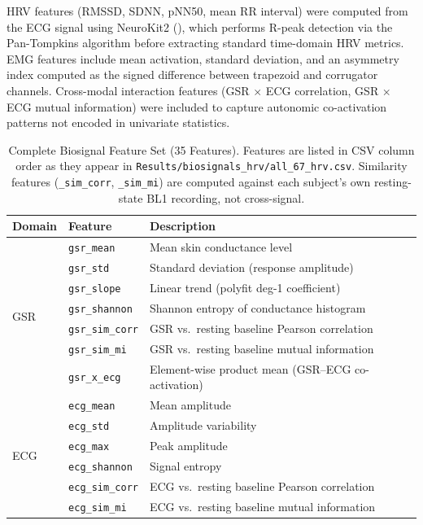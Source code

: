 \documentclass[10pt, twocolumn]{article}
\begin{document}
HRV features (RMSSD, SDNN, pNN50, mean RR interval) were computed from the ECG signal
using NeuroKit2 (\cite{Makowski2021}), which performs R-peak detection via the
Pan-Tompkins algorithm before extracting standard time-domain HRV metrics. EMG features
include mean activation, standard deviation, and an asymmetry index computed as the signed
difference between trapezoid and corrugator channels. Cross-modal interaction features
(GSR $\times$ ECG correlation, GSR $\times$ ECG mutual information) were included to capture
autonomic co-activation patterns not encoded in univariate statistics.

\begin{table}[t]
\centering
\caption{Complete Biosignal Feature Set (35 Features). Features are listed in
CSV column order as they appear in \texttt{Results/biosignals\_hrv/all\_67\_hrv.csv}.
Similarity features (\texttt{\_sim\_corr}, \texttt{\_sim\_mi}) are computed against
each subject's own resting-state BL1 recording, not cross-signal.}
\label{tab:features}
\small
\begin{tabular}{llp{7.8cm}}
\toprule
\textbf{Domain} & \textbf{Feature} & \textbf{Description} \\
\midrule
\multirow{7}{*}{GSR}
  & \texttt{gsr\_mean}       & Mean skin conductance level \\
  & \texttt{gsr\_std}        & Standard deviation (response amplitude) \\
  & \texttt{gsr\_slope}      & Linear trend (polyfit deg-1 coefficient) \\
  & \texttt{gsr\_shannon}    & Shannon entropy of conductance histogram \\
  & \texttt{gsr\_sim\_corr}  & GSR vs.\ resting baseline Pearson correlation \\
  & \texttt{gsr\_sim\_mi}    & GSR vs.\ resting baseline mutual information \\
  & \texttt{gsr\_x\_ecg}     & Element-wise product mean (GSR--ECG co-activation) \\
\midrule
\multirow{6}{*}{ECG}
  & \texttt{ecg\_mean}       & Mean amplitude \\
  & \texttt{ecg\_std}        & Amplitude variability \\
  & \texttt{ecg\_max}        & Peak amplitude \\
  & \texttt{ecg\_shannon}    & Signal entropy \\
  & \texttt{ecg\_sim\_corr}  & ECG vs.\ resting baseline Pearson correlation \\
  & \texttt{ecg\_sim\_mi}    & ECG vs.\ resting baseline mutual information \\

\end{tabular}
\end{table}
\end{document}
